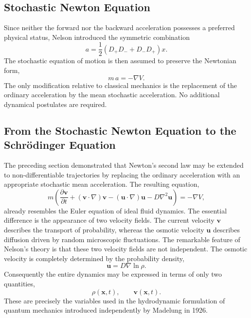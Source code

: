 \subsection{Stochastic Newton Equation}
Since neither the forward nor the backward acceleration possesses a
preferred physical status, Nelson introduced the symmetric combination
\begin{equation}
\boxed{a=\frac12\left(D_{+}D_{-}+D_{-}D_{+}\right)x.}
\label{eq:meanacceleration}
\end{equation}
The stochastic equation of motion is then assumed to preserve the
Newtonian form,
\begin{equation}
\boxed{m\,a=-\nabla V.}
\label{eq:stochasticnewton}
\end{equation}
The only modification relative to classical mechanics is the
replacement of the ordinary acceleration by the mean stochastic
acceleration.
No additional dynamical postulates are required.
\subsection{From the Stochastic Newton Equation to the Schrödinger Equation}
\label{sec:SchrodingerDerivation}
The preceding section demonstrated that Newton's second law may be
extended to non-differentiable trajectories by replacing the ordinary
acceleration with an appropriate stochastic mean acceleration. The
resulting equation,
\begin{equation}
m\left(\frac{\partial \mathbf v}{\partial t}
+(\mathbf v\cdot\nabla)\mathbf v
-(\mathbf u\cdot\nabla)\mathbf u
-D\nabla^2\mathbf u\right)
=-\nabla V,
\label{eq:EulerStochastic}
\end{equation}
already resembles the Euler equation of ideal fluid dynamics.
The essential difference is the appearance of two velocity fields.
The current velocity $\mathbf v$ describes the transport of probability,
whereas the osmotic velocity $\mathbf u$ describes diffusion driven by
random microscopic fluctuations.
The remarkable feature of Nelson's theory is that these two velocity
fields are not independent. The osmotic velocity is completely
determined by the probability density,
\begin{equation}
\boxed{\mathbf u=D\nabla\ln\rho .}
\label{eq:osmoticvelocity}
\end{equation}
Consequently the entire dynamics may be expressed in terms of only two
quantities,
\[\rho(\mathbf x,t),\qquad\mathbf v(\mathbf x,t).\]
These are precisely the variables used in the hydrodynamic formulation
of quantum mechanics introduced independently by Madelung in 1926.
